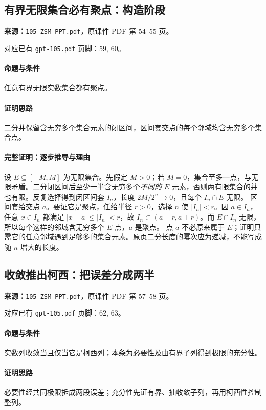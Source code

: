 \clearpage\subsection{有界无限集合必有聚点：构造阶段}
\textbf{来源：}\texttt{105-ZSM-PPT.pdf}，原课件 PDF 第 54--55 页。\par
对应已有 \texttt{gpt-105.pdf} 页脚：59, 60。\par
\paragraph{命题与条件}任意有界无限实数集合都有聚点。
\paragraph{证明思路}二分并保留含无穷多个集合元素的闭区间，区间套交点的每个邻域均含无穷多个集合点。
\paragraph{完整证明：逐步推导与理由}

设 $E\subseteq[-M,M]$ 为无限集合。先假定 $M>0$；若 $M=0$，集合至多一点，与无限矛盾。二分闭区间后至少一半含无穷多个\emph{不同的} $E$ 元素，否则两有限集合的并也有限。反复选择得到闭区间套 $I_n$，长度 $2M/2^n\to0$，且每个 $I_n\cap E$ 无限。
区间套给交点 $a$。要证它是聚点，任给半径 $r>0$，选择 $n$ 使 $|I_n|<r$。因 $a\in I_n$，任意 $x\in I_n$ 都满足 $|x-a|\le|I_n|<r$，故 $I_n\subset(a-r,a+r)$。而 $E\cap I_n$ 无限，所以每个这样的邻域含无穷多个 $E$ 点，$a$ 是聚点。
点 $a$ 不必原来属于 $E$；证明只需它的任意邻域遇到足够多的集合元素。原页二分长度的幂次应为递减，不能写成随 $n$ 增大的长度。

\clearpage\subsection{收敛推出柯西：把误差分成两半}
\textbf{来源：}\texttt{105-ZSM-PPT.pdf}，原课件 PDF 第 57--58 页。\par
对应已有 \texttt{gpt-105.pdf} 页脚：62, 63。\par
\paragraph{命题与条件}实数列收敛当且仅当它是柯西列；本条为必要性及由有界子列得到极限的充分性。
\paragraph{证明思路}必要性经共同极限拆成两段误差；充分性先证有界、抽收敛子列，再用柯西性控制整列。

